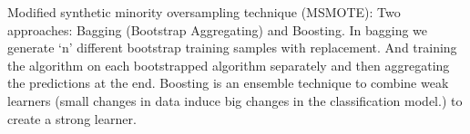 \documentclass[11pt]{article}
\theoremstyle{definition}
\theoremstyle{remark}
\begin{document}
Modified synthetic minority oversampling technique (MSMOTE): Two approaches: Bagging (Bootstrap Aggregating) and Boosting. In bagging we generate ‘n’ different bootstrap training samples with replacement. And training the algorithm on each bootstrapped algorithm separately and then aggregating the predictions at the end. 
Boosting is an ensemble technique to combine weak learners (small changes in data induce big changes in the classification model.) to create a strong learner. 

\newpage





\end{document}
